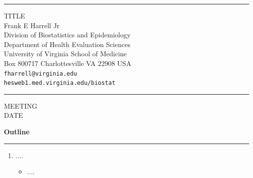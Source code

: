 \documentclass[a4,semhelv,semcolor,portrait,11pt]{seminar}
\newcommand{\bs}[1]{\begin{slide*}\Ti{#1}}
\newcommand{\es}{\end{slide*}}
\newcommand{\bi}{\begin{itemize}}
\newcommand{\ei}{\end{itemize}}
\newcommand{\be}{\begin{enumerate}}
\newcommand{\ee}{\end{enumerate}}
\newcommand{\Ti}[1]{\hfill {\textbf{\large \blue  #1}\\}%
  \vspace*{-1cm} \rule{\linewidth}{0.2mm}}
\begin{document}
\noindent\rule{\linewidth}{1mm}
\begin{flushright}
\huge
TITLE\\[2ex]
\Large Frank E Harrell Jr \\
\normalsize
Division of Biostatistics and Epidemiology \\
Department of Health Evaluation Sciences \\
University of Virginia School of Medicine \\
Box 800717 Charlottesville VA 22908 USA \\
{\tt fharrell@virginia.edu} \\
{\tt hesweb1.med.virginia.edu/biostat} \\
\end{flushright}
\rule{\linewidth}{1mm}
\begin{center}
\textsc{MEETING \\ DATE}
\end{center}
\thispagestyle{empty}

\bs{Outline}
\be
\item ....
   \bi
   \item ....
   \ei
\ee
\es
\end{document}
